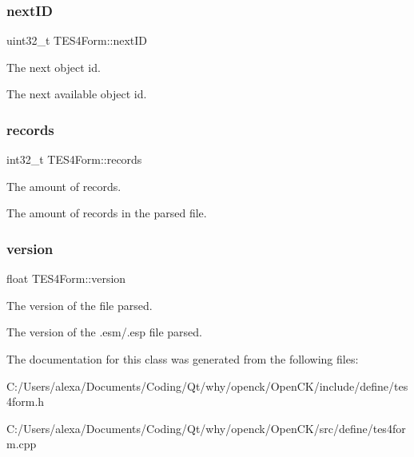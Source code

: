 \subsubsection{\texorpdfstring{next\+ID}{nextID}}
{\footnotesize\ttfamily uint32\+\_\+t T\+E\+S4\+Form\+::next\+ID\hspace{0.3cm}{\ttfamily [protected]}}



The next object id. 

The next available object id. \mbox{\label{class_t_e_s4_form_aa9442a2a6974797c0cbc80893eb1eb35}} 
\subsubsection{\texorpdfstring{records}{records}}
{\footnotesize\ttfamily int32\+\_\+t T\+E\+S4\+Form\+::records\hspace{0.3cm}{\ttfamily [protected]}}



The amount of records. 

The amount of records in the parsed file. \mbox{\label{class_t_e_s4_form_ac43b3ea26b907f6a493377bd8bcaa433}} 
\subsubsection{\texorpdfstring{version}{version}}
{\footnotesize\ttfamily float T\+E\+S4\+Form\+::version\hspace{0.3cm}{\ttfamily [protected]}}



The version of the file parsed. 

The version of the .esm/.esp file parsed. 

The documentation for this class was generated from the following files\+:\begin{DoxyCompactItemize}
\item 
C\+:/\+Users/alexa/\+Documents/\+Coding/\+Qt/why/openck/\+Open\+C\+K/include/define/tes4form.\+h\item 
C\+:/\+Users/alexa/\+Documents/\+Coding/\+Qt/why/openck/\+Open\+C\+K/src/define/tes4form.\+cpp\end{DoxyCompactItemize}
